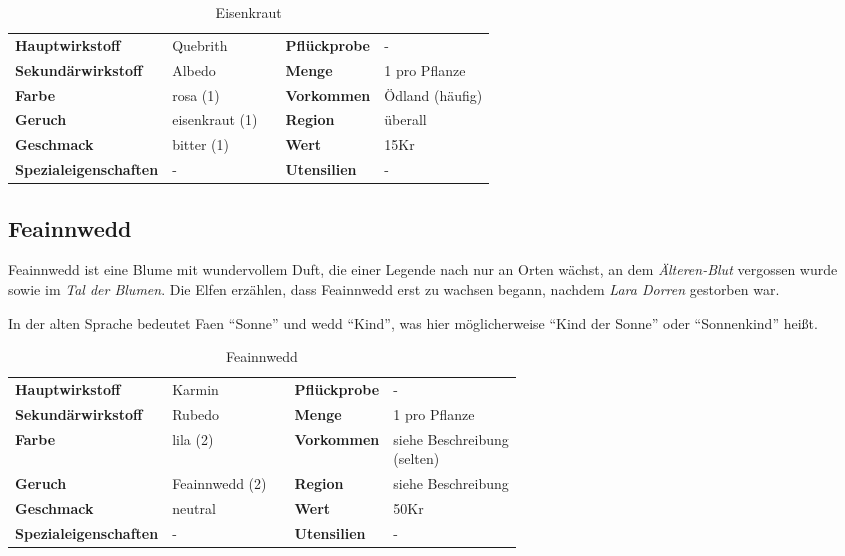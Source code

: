 \begin{table}[h] 
\begin{center} 
\begin{tabular}{|l|l|p{1cm}|l|l|} 
  	\cline{1-2} \cline{4-5} 
  	\textbf{Hauptwirkstoff} & Quebrith && \textbf{Pflückprobe} & - \\ \cline{1-2} \cline{4-5} 
  	\textbf{Sekundärwirkstoff} & Albedo && \textbf{Menge} & 1 pro Pflanze \\ \cline{1-2} \cline{4-5} 
  	\textbf{Farbe} & rosa (1) && \textbf{Vorkommen} & Ödland (häufig) \\ \cline{1-2} \cline{4-5} 
  	\textbf{Geruch} & eisenkraut (1) && \textbf{Region} & überall \\ \cline{1-2} \cline{4-5} 
  	\textbf{Geschmack} & bitter (1) && \textbf{Wert} & 15Kr \\ \cline{1-2} \cline{4-5} 
  	\textbf{Spezialeigenschaften} & - && \textbf{Utensilien} & - \\ \cline{1-2} \cline{4-5} 
\end{tabular} 
\end{center} 
\caption{Eisenkraut} 
\label{tab:eisenkraut} 
\end{table}


\subsection{Feainnwedd}
Feainnwedd ist eine Blume mit wundervollem Duft, die einer Legende nach nur an Orten wächst, an dem \textit{Älteren-Blut} vergossen wurde sowie im \textit{Tal der Blumen}. Die Elfen erzählen, dass Feainnwedd erst zu wachsen begann, nachdem \textit{Lara Dorren} gestorben war.

In der alten Sprache bedeutet Faen "`Sonne"' und wedd "`Kind"', was hier möglicherweise "`Kind der Sonne"' oder "`Sonnenkind"' heißt. 

\begin{table}[h] 
\begin{center} 
\begin{tabular}{|l|l|p{1cm}|l|l|} 
  	\cline{1-2} \cline{4-5} 
  	\textbf{Hauptwirkstoff} & Karmin && \textbf{Pflückprobe} & - \\ \cline{1-2} \cline{4-5} 
  	\textbf{Sekundärwirkstoff} & Rubedo && \textbf{Menge} & 1 pro Pflanze \\ \cline{1-2} \cline{4-5} 
  	\textbf{Farbe} & lila (2) && \textbf{Vorkommen} & \brcell{siehe Beschreibung \\ (selten)} \\ \cline{1-2} \cline{4-5} 
  	\textbf{Geruch} & Feainnwedd (2) && \textbf{Region} & siehe Beschreibung \\ \cline{1-2} \cline{4-5} 
  	\textbf{Geschmack} & neutral && \textbf{Wert} & 50Kr \\ \cline{1-2} \cline{4-5} 
  	\textbf{Spezialeigenschaften} & - && \textbf{Utensilien} & - \\ \cline{1-2} \cline{4-5} 
\end{tabular} 
\end{center} 
\caption{Feainnwedd} 
\label{tab:feainnwedd} 
\end{table}



